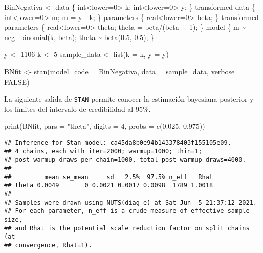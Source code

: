 \documentclass[
  12pt,
  spanish,
]{book}
\newenvironment{Shaded}{\begin{snugshade}}{\end{snugshade}}
\newcommand{\AttributeTok}[1]{\textcolor[rgb]{0.77,0.63,0.00}{#1}}
\newcommand{\ConstantTok}[1]{\textcolor[rgb]{0.00,0.00,0.00}{#1}}
\newcommand{\DecValTok}[1]{\textcolor[rgb]{0.00,0.00,0.81}{#1}}
\newcommand{\FloatTok}[1]{\textcolor[rgb]{0.00,0.00,0.81}{#1}}
\newcommand{\FunctionTok}[1]{\textcolor[rgb]{0.00,0.00,0.00}{#1}}
\newcommand{\NormalTok}[1]{#1}
\newcommand{\OtherTok}[1]{\textcolor[rgb]{0.56,0.35,0.01}{#1}}
\newcommand{\StringTok}[1]{\textcolor[rgb]{0.31,0.60,0.02}{#1}}
\theoremstyle{definition}
\theoremstyle{definition}
\theoremstyle{definition}
\theoremstyle{definition}
\theoremstyle{remark}
\begin{document}
\begin{Shaded}
\begin{Highlighting}[]
\NormalTok{BinNegativa }\OtherTok{\textless{}{-}} \StringTok{\textquotesingle{}data \{}
\StringTok{  int\textless{}lower=0\textgreater{} k;}
\StringTok{  int\textless{}lower=0\textgreater{} y;}
\StringTok{\}}
\StringTok{transformed data \{}
\StringTok{  int\textless{}lower=0\textgreater{} m;}
\StringTok{  m = y {-} k;}
\StringTok{\}}
\StringTok{parameters \{}
\StringTok{  real\textless{}lower=0\textgreater{} beta;}
\StringTok{\}}
\StringTok{transformed parameters \{}
\StringTok{  real\textless{}lower=0\textgreater{} theta;}
\StringTok{  theta = beta/(beta + 1);}
\StringTok{\}}
\StringTok{model \{}
\StringTok{  m \textasciitilde{} neg\_binomial(k, beta);}
\StringTok{  theta \textasciitilde{} beta(0.5, 0.5);}
\StringTok{\}}
\StringTok{\textquotesingle{}}

\NormalTok{y }\OtherTok{\textless{}{-}} \DecValTok{1106}
\NormalTok{k }\OtherTok{\textless{}{-}} \DecValTok{5}
\NormalTok{sample\_data }\OtherTok{\textless{}{-}} \FunctionTok{list}\NormalTok{(}\AttributeTok{k =}\NormalTok{ k, }\AttributeTok{y =}\NormalTok{ y)}

\NormalTok{BNfit }\OtherTok{\textless{}{-}} \FunctionTok{stan}\NormalTok{(}\AttributeTok{model\_code =}\NormalTok{ BinNegativa,}
              \AttributeTok{data =}\NormalTok{ sample\_data, }\AttributeTok{verbose =} \ConstantTok{FALSE}\NormalTok{)}
\end{Highlighting}
\end{Shaded}

La siguiente salida de \texttt{STAN} permite conocer la estimación bayesiana posterior y los límites del intervalo de credibilidad al 95\%.

\begin{Shaded}
\begin{Highlighting}[]
\FunctionTok{print}\NormalTok{(BNfit, }\AttributeTok{pars =} \StringTok{"theta"}\NormalTok{, }
      \AttributeTok{digits =} \DecValTok{4}\NormalTok{, }\AttributeTok{probs =} \FunctionTok{c}\NormalTok{(}\FloatTok{0.025}\NormalTok{, }\FloatTok{0.975}\NormalTok{))}
\end{Highlighting}
\end{Shaded}

\begin{verbatim}
## Inference for Stan model: ca45da8b0e94b143378403f155105e09.
## 4 chains, each with iter=2000; warmup=1000; thin=1; 
## post-warmup draws per chain=1000, total post-warmup draws=4000.
## 
##         mean se_mean     sd   2.5%  97.5% n_eff   Rhat
## theta 0.0049       0 0.0021 0.0017 0.0098  1789 1.0018
## 
## Samples were drawn using NUTS(diag_e) at Sat Jun  5 21:37:12 2021.
## For each parameter, n_eff is a crude measure of effective sample size,
## and Rhat is the potential scale reduction factor on split chains (at 
## convergence, Rhat=1).
\end{verbatim}
\end{document}
